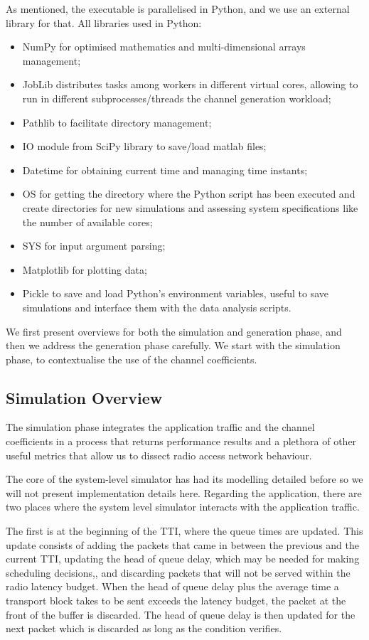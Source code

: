 As mentioned, the executable is parallelised in Python, and we use an external library for that. All libraries used in Python:

\begin{itemize}
    \item NumPy for optimised mathematics and multi-dimensional arrays management;
    \item JobLib distributes tasks among workers in different virtual cores, allowing to run in different subprocesses/threads the channel generation workload;
    \item Pathlib to facilitate directory management;
    \item IO module from SciPy library to save/load matlab files;
    \item Datetime for obtaining current time and managing time instants;
    \item OS for getting the directory where the Python script has been executed and create directories for new simulations and assessing system specifications like the number of available cores;
    \item SYS for input argument parsing;
    \item Matplotlib for plotting data;
    \item Pickle to save and load Python's environment variables, useful to save simulations and interface them with the data analysis scripts.
\end{itemize}

We first present overviews for both the simulation and generation phase, and then we address the generation phase carefully. We start with the simulation phase, to contextualise the use of the channel coefficients.

\subsection*{Simulation Overview}

The simulation phase integrates the application traffic and the channel coefficients in a process that returns performance results and a plethora of other useful metrics that allow us to dissect radio access network behaviour.

The core of the system-level simulator has had its modelling detailed before so we will not present implementation details here. Regarding the application, there are two places where the system level simulator interacts with the application traffic. 

The first is at the beginning of the TTI, where the queue times are updated. This update consists of adding the packets that came in between the previous and the current TTI, updating the head of queue delay, which may be needed for making scheduling decisions,, and discarding packets that will not be served within the radio latency budget. When the head of queue delay plus the average time a transport block takes to be sent exceeds the latency budget, the packet at the front of the buffer is discarded. The head of queue delay is then updated for the next packet which is discarded as long as the condition verifies.


